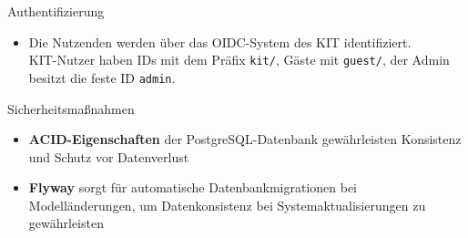 \documentclass{sdqbeamer}
\begin{document}
\begin{frame}{Authentifizierung}
    \begin{itemize}
        \item Die Nutzenden werden über das OIDC-System des KIT identifiziert.\\ KIT-Nutzer haben IDs mit dem Präfix \texttt{kit/}, Gäste mit \texttt{guest/}, der Admin besitzt die feste ID \texttt{admin}.
    \end{itemize}
\end{frame}

\begin{frame}{Sicherheitsmaßnahmen}
    \begin{itemize}
        \item \textbf{ACID-Eigenschaften} der PostgreSQL-Datenbank gewährleisten Konsistenz und Schutz vor Datenverlust
        \item \textbf{Flyway} sorgt für automatische Datenbankmigrationen bei Modelländerungen, um Datenkonsistenz bei Systemaktualisierungen zu gewährleisten
    \end{itemize}
\end{frame}
\end{document}
